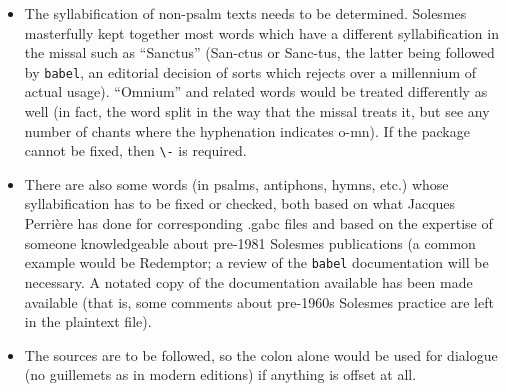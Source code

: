 \documentclass[11pt]{article}
\begin{document}
\begin{itemize}
\item
The syllabification of non-psalm texts needs to be determined. Solesmes masterfully kept together most words which have a different syllabification in the missal such as ``Sanctus'' (San-ctus or Sanc-tus, the latter being followed by \verb|babel|, an editorial decision of sorts which rejects over a millennium of actual usage). ``Omnium'' and related words would be treated differently as well (in fact, the word split in the way that the missal treats it, but see any number of chants where the hyphenation indicates o-mn). If the package cannot be fixed, then \verb|\-| is required.

\item
There are also some words (in psalms, antiphons, hymns, etc.) whose syllabification has to be fixed or checked, both based on what Jacques Perrière has done for corresponding .gabc files and based on the expertise of someone knowledgeable about pre-1981 Solesmes publications (a common example would be Redemptor; a review of the \verb|babel| documentation will be necessary. A notated copy of the documentation available has been made available (that is, some comments about pre-1960s Solesmes practice are left in the plaintext file).

\item
The sources are to be followed, so the colon alone would be used for dialogue (no guillemets as in modern editions) if anything is offset at all.

\end{itemize}
\end{document}
